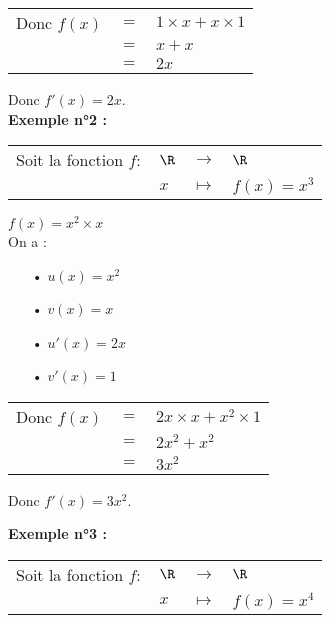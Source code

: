 \vspace*{.3cm}

\begin{tabular}{lll}
Donc $f(x)$ & $=$ & $1 \times x + x \times 1$ \\
& $=$ & $x + x$ \\
& $=$ & $2x$ \\
\end{tabular}

\vspace*{.3cm}

Donc $f'(x) = 2x$. \\

\textbf{Exemple n°2 :} \\

\begin{tabular}{llll}
Soit la fonction $f :$ & $\R$ & $\longrightarrow$ & $\R$ \\
& $x$ & $\longmapsto$ & $f(x) = x^3$ \\
\end{tabular}

\vspace*{.3cm}

$f(x) = x^2 \times x$ \\

On a : \\

\begin{itemize}
\item[•] $u\left(x\right) = x^2$
\item[•] $v\left(x\right) = x$
\item[•] $u'\left(x\right) = 2x$
\item[•] $v'\left(x\right) = 1$
\end{itemize}

\vspace*{.3cm}

\begin{tabular}{lll}
Donc $f(x)$ & $=$ & $2x \times x + x^2 \times 1$ \\
& $=$ & $2x^2 + x^2$ \\
& $=$ & $3x^2$ \\
\end{tabular}

Donc $f'(x) = 3x^2$. 

\newpage

\textbf{Exemple n°3 :} \\

\begin{tabular}{llll}
Soit la fonction $f :$ & $\R$ & $\longrightarrow$ & $\R$ \\
& $x$ & $\longmapsto$ & $f(x) = x^4$ \\
\end{tabular}

